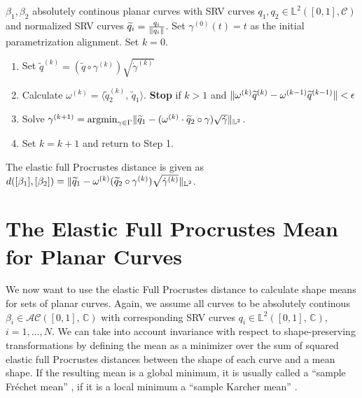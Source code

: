 \begin{algorithm}
  \label{alg:2-dist}
  $\beta_1, \beta_2$ absolutely continous planar curves with SRV curves $q_1, q_2 \in \mathbb{L}^2([0,1], \mathcal{C})$ and normalized SRV curves $\widetilde q_i = \frac{q_i}{\lVert q_i\rVert}$.
  Set $\gamma^{(0)}(t) = t$  as the initial parametrization alignment.
  Set $k = 0$. 
  \begin{enumerate}
    \item Set $\widetilde q^{(k)} = (\widetilde q \circ \gamma^{(k)}) \sqrt{\dot\gamma^{(k)}}$
    \item Calculate $\omega^{(k)} = \langle \widetilde q_2^{(k)},\, \widetilde q_1 \rangle$. \textbf{Stop} if $k > 1$ and $\lVert\omega^{(k)} \widetilde q^{(k)} - \omega^{(k-1)} \widetilde q^{(k-1)}\rVert < \epsilon$
    \item Solve $\gamma^{(k+1)} = \operatorname*{argmin}_{\gamma \in \Gamma} \lVert\widetilde q_1 - (\omega^{(k)} \cdot \widetilde q_2 \circ \gamma ) \sqrt{\dot\gamma}\rVert_{\mathbb{L}^2}$.
    \item Set $k = k+1$ and return to Step 1.
  \end{enumerate}
  The elastic full Procrustes distance is given as $d([\beta_1],[\beta_2]) = \lVert\widetilde q_1 - \omega^{(k)} ( \widetilde q_2 \circ \gamma^{(k)} ) \sqrt{\dot{\gamma}^{(k)}}\rVert_{\mathbb{L}^2}$.
\end{algorithm}

%



\section{The Elastic Full Procrustes Mean for Planar Curves}
\label{sec:2-mean}
We now want to use the elastic Full Procrustes distance to calculate shape means for sets of planar curves.
Again, we assume all curves to be absolutely continous $\beta_i \in \mathcal{AC}([0,1],\, \mathbb{C})$ with corresponding SRV curves $q_i \in \mathbb{L}^2([0,1],\, \mathbb{C})$, $i=1,\dots,N$.
We can take into account invariance with respect to shape-preserving transformations by defining the mean as a minimizer over the sum of squared elastic full Procrustes distances between the shape of each curve and a mean shape.
If the resulting mean is a global minimum, it is usually called a \enquote{sample Fr\'echet mean} \parencite{Frechet1948}, if it is a local minimum a \enquote{sample Karcher mean} \parencite{Karcher1977} \parencite[see][111]{DrydenMardia2016}.


